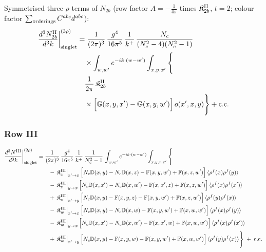\documentclass[9pt]{article}
\def\mf#1{\mathbb{#1}}
\numberwithin{equation}{section}
\begin{document}
{ Symmetrised three-$\rho$ terms of $N_{2b}$ (row factor $A=-\frac{1}{4\pi}$ times $\mathfrak{K}^{\rm II}_{2b}$, $t=2$; colour factor $\sum_{\rm orderings}C^{abc}d^{abc}$):
\begin{align}
\frac{d^{3}N_{2b}^{\rm II}}{d^{3}k}\bigg|^{(3\rho)}_{\rm singlet}&=\frac{1}{(2\pi)^{3}}\,\frac{g^{4}}{16\pi^{5}}\,\frac{1}{k^{+}}\,\frac{N_{c}}{(N_{c}^{2}-4)(N_{c}^{2}-1)}\notag\\
&\quad\times\int_{w,w'}e^{-ik\cdot(w-w')}\int_{x,y,x'}\Bigg\{\notag\\
&\quad\frac{1}{2\pi}\,\mathfrak{K}^{\rm II}_{2b}\notag\\
&\quad\times\Big[\mf{G}(x,y,x')-\mf{G}(x,y,w')\Big]\,o(x',x,y)\Bigg\}+{\rm c.c.}\label{eq:s-o-I-II-2b}
\end{align}

\subsubsection*{Row III}

\begin{align}
\frac{d^{3}N^{\rm III}}{d^{3}k}\bigg|^{(2\rho)}_{\rm singlet}&=\frac{1}{(2\pi)^{3}}\,\frac{g^{4}}{16\pi^{5}}\,\frac{1}{k^{+}}\,\frac{1}{N_{c}^{2}-1}\,\int_{w,w'}e^{-ik\cdot(w-w')}\int_{x,y,z,x'}\Bigg\{\notag\\
&\qquad -\,\mathfrak{K}^{\rm III}_{z}\big|_{x'\to x}\,\Big[N_{c}\mf{D}(x,y)-N_{c}\mf{D}(x,z)-\mf{F}(x,y,w')+\mf{F}(x,z,w')\Big]\,\langle\rho^{f}(x)\rho^{f}(y)\rangle\notag\\
&\qquad -\,\mathfrak{K}^{\rm III}_{z}\big|_{y\to x}\,\Big[N_{c}\mf{D}(x,x')-N_{c}\mf{D}(x,w')-\mf{F}(x,x',z)+\mf{F}(x,z,w')\Big]\,\langle\rho^{f}(x)\rho^{f}(x')\rangle\notag\\
&\qquad +\,\mathfrak{K}^{\rm III}_{z}\big|_{x'\to y}\,\Big[N_{c}\mf{D}(x,y)-\mf{F}(x,y,z)-\mf{F}(x,y,w')+\mf{F}(x,z,w')\Big]\,\langle\rho^{f}(y)\rho^{f}(x)\rangle\notag\\
&\qquad -\,\mathfrak{K}^{\rm III}_{w}\big|_{x'\to x}\,\Big[N_{c}\mf{D}(x,y)-N_{c}\mf{D}(x,w)-\mf{F}(x,y,w')+\mf{F}(x,w,w')\Big]\,\langle\rho^{f}(x)\rho^{f}(y)\rangle\notag\\
&\qquad -\,\mathfrak{K}^{\rm III}_{w}\big|_{y\to x}\,\Big[N_{c}\mf{D}(x,x')-N_{c}\mf{D}(x,w')-\mf{F}(x,x',w)+\mf{F}(x,w,w')\Big]\,\langle\rho^{f}(x)\rho^{f}(x')\rangle\notag\\
&\qquad +\,\mathfrak{K}^{\rm III}_{w}\big|_{x'\to y}\,\Big[N_{c}\mf{D}(x,y)-\mf{F}(x,y,w)-\mf{F}(x,y,w')+\mf{F}(x,w,w')\Big]\,\langle\rho^{f}(y)\rho^{f}(x)\rangle\Bigg\}\;+\;{\rm c.c.}\label{eq:s-I-III}
\end{align}

}
\end{document}
